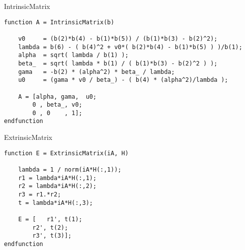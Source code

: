 \documentclass[a4paper,10pt]{article}
\begin{document}
\begin{paragraph}{IntrinsicMatrix}
\begin{Verbatim}
function A = IntrinsicMatrix(b)

	v0     = (b(2)*b(4) - b(1)*b(5)) / (b(1)*b(3) - b(2)^2);
	lambda = b(6) - ( b(4)^2 + v0*( b(2)*b(4) - b(1)*b(5) ) )/b(1);
	alpha  = sqrt( lambda / b(1) );
	beta_  = sqrt( lambda * b(1) / ( b(1)*b(3) - b(2)^2 ) );
	gama   = -b(2) * (alpha^2) * beta_ / lambda;
	u0     = (gama * v0 / beta_) - ( b(4) * (alpha^2)/lambda );
  
	A = [alpha, gama,  u0;
		0 , beta_, v0;
		0 , 0    , 1];
endfunction
\end{Verbatim}
\end{paragraph}

\newpage

\begin{paragraph}{ExtrinsicMatrix}
\begin{Verbatim}
function E = ExtrinsicMatrix(iA, H)

	lambda = 1 / norm(iA*H(:,1)); 
	r1 = lambda*iA*H(:,1);
	r2 = lambda*iA*H(:,2);
	r3 = r1.*r2;
	t = lambda*iA*H(:,3);
	
	E = [   r1', t(1);
		r2', t(2);
		r3', t(3)];
endfunction
\end{Verbatim}
\end{paragraph}
\end{document}
